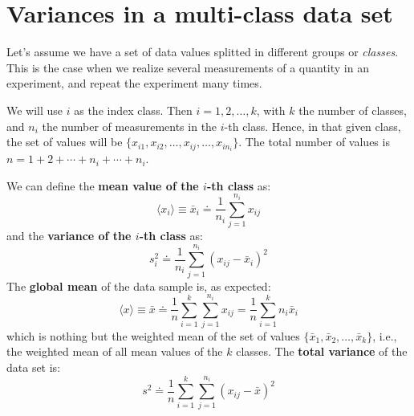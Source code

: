 \documentclass[10pt]{article}
\def\defas{\doteq}
\def\mean#1{\ensuremath{\langle #1 \rangle}}
\begin{document}
\section*{Variances in a multi-class data set}
\label{sec:variances}

Let's assume we have a set of data values splitted in different groups
or \emph{classes}. This is the case when we realize several
measurements of a quantity in an experiment, and repeat the experiment
many times.

We will use $i$ as the index class. Then $i=1,2,\ldots,k$, with $k$ the
number of classes, and $n_i$ the number of measurements in the $i$-th
class. Hence, in that given class, the set of values will be
$\{x_{i1},x_{i2},\ldots,x_{ij},\ldots,x_{in_i}\}$. The total number of values is $n=1+2+\cdots+n_i+\cdots+n_i$.

We can define the \textbf{mean value of the $i$-th class } as:
%
\begin{equation}
  \label{eq:meani}
  \mean{x_i} \equiv \bar{x}_i \defas \frac{1}{n_i} \sum_{j=1}^{n_i} x_{ij}
\end{equation}
%
and the \textbf{variance of the $i$-th class} as:
%
\begin{equation}
  \label{eq:vari}
  s_i^2 \defas \frac{1}{n_i} \sum_{j=1}^{n_i} \left(x_{ij}-\bar{x}_i\right)^2
\end{equation}
%
The \textbf{global mean} of the data sample is, as expected:
%
\begin{equation}
  \label{eq:mean}
  \mean{x} \equiv \bar{x} \defas \frac{1}{n} \sum_{i=1}^k \sum_{j=1}^{n_i} x_{ij} 
  = \frac{1}{n} \sum_{i=1}^k n_i \bar{x}_i
\end{equation}
%
which is nothing but the weighted mean of the set of values
$\{\bar{x}_1, \bar{x}_2, \ldots,\bar{x}_k\}$, i.e., the weighted mean of all
mean values of the $k$ classes. The \textbf{total variance} of the
data set is:
%
\begin{equation}
  \label{eq:var}
  s^2 \defas \frac{1}{n} \sum_{i=1}^k \sum_{j=1}^{n_i} \left(x_{ij}-\bar{x}\right)^2
\end{equation}
\end{document}

